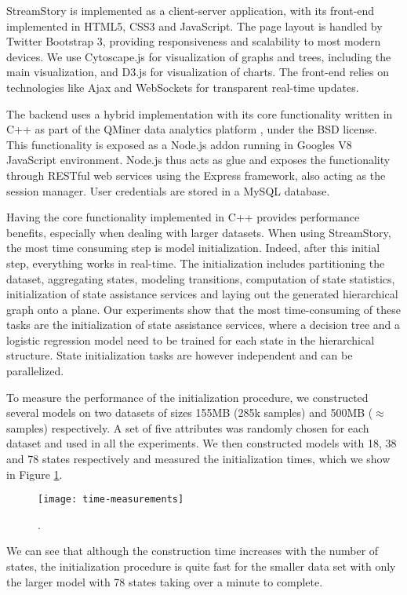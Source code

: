 StreamStory is implemented as a client-server application, with its front-end implemented in HTML5,
CSS3 and JavaScript. The page layout is handled by Twitter Bootstrap 3, providing 
responsiveness and scalability to most modern devices. We use Cytoscape.js
for visualization of graphs and trees, including the main visualization, and D3.js for visualization of charts.
The front-end relies on technologies like Ajax and WebSockets for transparent real-time
updates.

The backend uses a hybrid implementation with its core functionality written in C++
as part of the QMiner data analytics platform \cite{qminer}, under the BSD license.
This functionality is exposed as a Node.js addon running in Googles V8 JavaScript
environment. Node.js thus acts as glue and exposes the functionality through RESTful
web services using the Express framework, also acting as the session manager.
User credentials  are stored in a MySQL database.

Having the core functionality implemented in C++ provides performance benefits, especially
when dealing with larger datasets. When using StreamStory, the most time consuming step
is model initialization. Indeed, after this initial step, everything works in real-time.
The initialization includes partitioning the dataset, aggregating states, modeling transitions,
computation of state statistics, initialization of state assistance services and laying out the generated
hierarchical graph onto a plane. Our experiments show that the most time-consuming of these tasks are
the initialization of state assistance services, where a decision tree and a logistic regression
model need to be trained for each state in the hierarchical structure. State initialization tasks
are however independent and can be parallelized.

To measure the performance of the initialization procedure, we constructed several models on two datasets
of sizes 155MB (285k samples) and 500MB ($\approx$  samples) respectively. A set of five attributes
was randomly chosen for each dataset and used in all the experiments. We
then constructed models with 18, 38 and 78 states respectively and measured the initialization times,
which we show in Figure \ref{fig:performance}.
\begin{figure}[h!]
	\centering
	\texttt{[image: time-measurements]}
	\caption{\lstopar{[TODO]}.}
	\label{fig:performance}
\end{figure}
We can see that although the construction time increases with the number of states, the initialization
procedure is quite fast for the smaller data set with only the larger model with 78 states taking over 
a minute to complete. 

